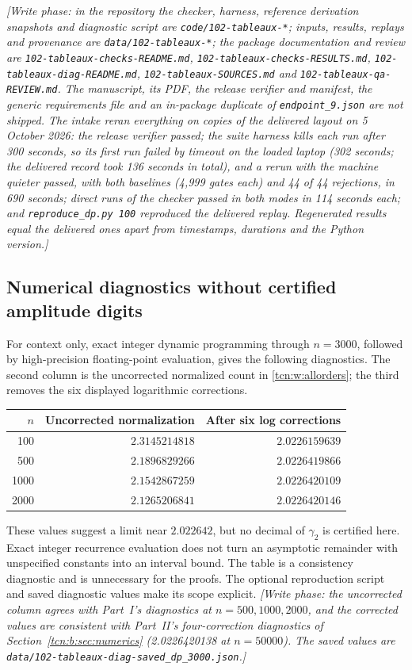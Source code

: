 \documentclass[11pt,letterpaper]{article}
\theoremstyle{remark}
\begin{document}
\emph{[Write phase: in the repository the checker, harness, reference derivation snapshots and diagnostic script are \textup{\nolinkurl{code/102-tableaux-*}}; inputs, results, replays and provenance are \textup{\nolinkurl{data/102-tableaux-*}}; the package documentation and review are \textup{\nolinkurl{102-tableaux-checks-README.md}}, \textup{\nolinkurl{102-tableaux-checks-RESULTS.md}}, \textup{\nolinkurl{102-tableaux-diag-README.md}}, \textup{\nolinkurl{102-tableaux-SOURCES.md}} and \textup{\nolinkurl{102-tableaux-qa-REVIEW.md}}. The manuscript, its PDF, the release verifier and manifest, the generic requirements file and an in-package duplicate of \textup{\nolinkurl{endpoint_9.json}} are not shipped. The intake reran everything on copies of the delivered layout on 5 October 2026: the release verifier passed; the suite harness kills each run after 300 seconds, so its first run failed by timeout on the loaded laptop (302 seconds; the delivered record took 136 seconds in total), and a rerun with the machine quieter passed, with both baselines (4,999 gates each) and 44 of 44 rejections, in 690 seconds; direct runs of the checker passed in both modes in 114 seconds each; and \texttt{reproduce\_dp.py 100} reproduced the delivered replay. Regenerated results equal the delivered ones apart from timestamps, durations and the Python version.]}

\subsection{Numerical diagnostics without certified amplitude digits}\label{tcn:w:sec:numerics}
For context only, exact integer dynamic programming through $n=3000$, followed by high-precision floating-point evaluation, gives the following diagnostics. The second column is the uncorrected normalized count in \eqref{tcn:w:allorders}; the third removes the six displayed logarithmic corrections.
\begin{center}
\begin{tabular}{rrr}
\toprule
$n$ & Uncorrected normalization & After six log corrections\\
\midrule
100 & $2.3145214818$ & $2.0226159639$\\
500 & $2.1896829266$ & $2.0226419866$\\
1000 & $2.1542867259$ & $2.0226420109$\\
2000 & $2.1265206841$ & $2.0226420146$\\
\bottomrule
\end{tabular}
\end{center}
These values suggest a limit near $2.022642$, but no decimal of $\gamma_2$ is certified here. Exact integer recurrence evaluation does not turn an asymptotic remainder with unspecified constants into an interval bound. The table is a consistency diagnostic and is unnecessary for the proofs. The optional reproduction script and saved diagnostic values make its scope explicit. \emph{[Write phase: the uncorrected column agrees with Part~I's diagnostics at $n=500,1000,2000$, and the corrected values are consistent with Part~II's four-correction diagnostics of Section~\ref{tcn:b:sec:numerics} (2.0226420138 at $n=50000$). The saved values are \textup{\nolinkurl{data/102-tableaux-diag-saved_dp_3000.json}}.]}
\end{document}
